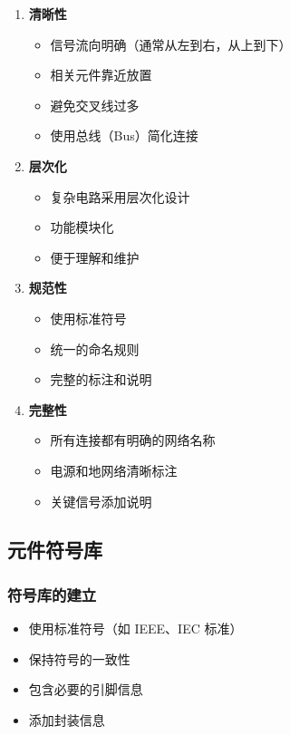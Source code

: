 \begin{enumerate}
  \item \textbf{清晰性}
    \begin{itemize}
      \item 信号流向明确（通常从左到右，从上到下）
      \item 相关元件靠近放置
      \item 避免交叉线过多
      \item 使用总线（Bus）简化连接
    \end{itemize}

  \item \textbf{层次化}
    \begin{itemize}
      \item 复杂电路采用层次化设计
      \item 功能模块化
      \item 便于理解和维护
    \end{itemize}

  \item \textbf{规范性}
    \begin{itemize}
      \item 使用标准符号
      \item 统一的命名规则
      \item 完整的标注和说明
    \end{itemize}

  \item \textbf{完整性}
    \begin{itemize}
      \item 所有连接都有明确的网络名称
      \item 电源和地网络清晰标注
      \item 关键信号添加说明
    \end{itemize}
\end{enumerate}

\subsection{元件符号库}

\subsubsection{符号库的建立}

\begin{itemize}
  \item 使用标准符号（如 IEEE、IEC 标准）
  \item 保持符号的一致性
  \item 包含必要的引脚信息
  \item 添加封装信息
\end{itemize}

